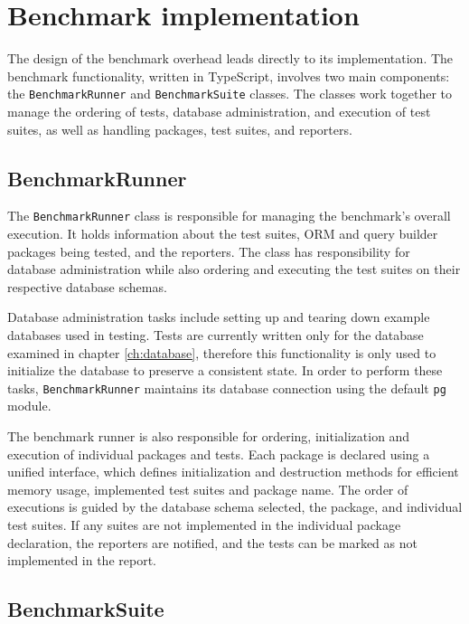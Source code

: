 \chapter{Benchmark implementation}

The design of the benchmark overhead leads directly to its implementation. The
benchmark functionality, written in TypeScript, involves two main components:
the \texttt{BenchmarkRunner} and \texttt{BenchmarkSuite} classes. The classes
work together to manage the ordering of tests, database administration, and
execution of test suites, as well as handling packages, test suites, and
reporters.


\section{BenchmarkRunner}

The \texttt{BenchmarkRunner} class is responsible for managing the benchmark’s
overall execution. It holds information about the test suites, ORM and query
builder packages being tested, and the reporters. The class has responsibility
for database administration while also ordering and executing the test suites on
their respective database schemas.

Database administration tasks include setting up and tearing down example
databases used in testing. Tests are currently written only for the database
examined in chapter \ref{ch:database}, therefore this functionality is only used
to initialize the database to preserve a consistent state. In order to perform
these tasks, \texttt{BenchmarkRunner} maintains its database connection using
the default \texttt{pg} module.

The benchmark runner is also responsible for ordering, initialization and
execution of individual packages and tests. Each package is declared using a
unified interface, which defines initialization and destruction methods for
efficient memory usage, implemented test suites and package name. The order of
executions is guided by the database schema selected, the package, and
individual test suites. If any suites are not implemented in the individual
package declaration, the reporters are notified, and the tests can be marked as
not implemented in the report.

\section{BenchmarkSuite}

